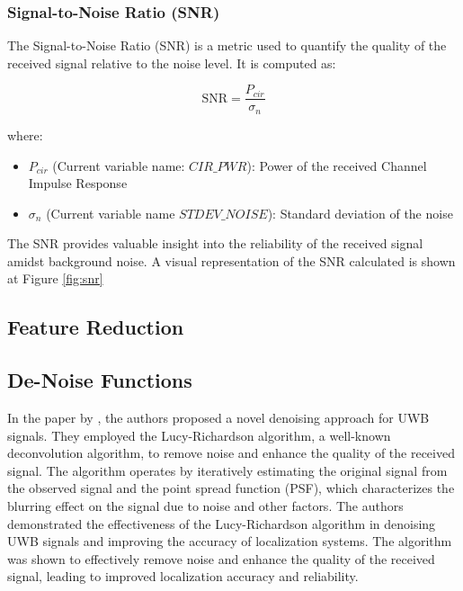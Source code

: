 \subsubsection{Signal-to-Noise Ratio (SNR)}\label{snr}

The Signal-to-Noise Ratio (SNR) is a metric used to quantify the quality of the received signal relative to the noise level. It is computed as:

\begin{equation}
  \text{SNR} = \frac{P_{cir}}{\sigma_n}
\end{equation}

where:

\begin{itemize}
  \item $P_{cir}$ (Current variable name: $CIR\_PWR$): Power of the received Channel Impulse Response
  \item $\sigma_n$ (Current variable name $STDEV\_NOISE$): Standard deviation of the noise
\end{itemize}

The SNR provides valuable insight into the reliability of the received signal amidst background noise. A visual representation of the SNR calculated is shown at Figure \ref{fig:snr}

\subsection{Feature Reduction}\label{feature_reduction}

\subsection{De-Noise Functions}\label{de_noise_Functions}

In the paper by \cite{jiang_uwb_2020}, the authors proposed a novel denoising approach for UWB signals. They employed the Lucy-Richardson algorithm, a well-known deconvolution algorithm, to remove noise and enhance the quality of the received signal. The algorithm operates by iteratively estimating the original signal from the observed signal and the point spread function (PSF), which characterizes the blurring effect on the signal due to noise and other factors. The authors demonstrated the effectiveness of the Lucy-Richardson algorithm in denoising UWB signals and improving the accuracy of localization systems. The algorithm was shown to effectively remove noise and enhance the quality of the received signal, leading to improved localization accuracy and reliability.

